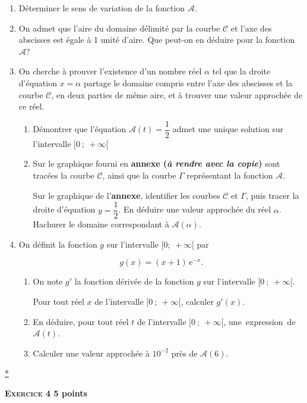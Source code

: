 \documentclass[10pt]{article}
\begin{document}
\begin{enumerate}
\item Déterminer le sens de variation de la fonction $\mathcal{A}$.
\item On admet que l'aire du domaine délimité par la courbe $\mathcal{C}$ et l'axe des abscisses est égale à 1 unité d'aire. Que peut-on en déduire pour la fonction $\mathcal{A}$?
\item On cherche à prouver l'existence d'un nombre réel $\alpha$ tel que la droite d'équation $x =\alpha$ partage le domaine compris entre l'axe des abscisses et la courbe $\mathcal{C}$, en deux parties de même aire, et à trouver une valeur approchée de ce réel.
	\begin{enumerate}
		\item Démontrer que l'équation $\mathcal{A}(t)=\dfrac12$ admet une unique solution sur l'intervalle $[0~;~+\infty[$
		\item Sur le graphique fourni en \textbf{annexe (\emph{à rendre avec la copie})} sont tracées la courbe $\mathcal{C}$, ainsi que la courbe $\Gamma$ représentant la fonction $\mathcal{A}$.
		
Sur le graphique de l'\textbf{annexe}, identifier les courbes $\mathcal{C}$ et $\Gamma$, puis tracer la droite d'équation $y=\dfrac12$. En déduire une valeur approchée du réel $\alpha$. Hachurer le domaine correspondant à $\mathcal{A}(\alpha)$.
	\end{enumerate}
\item On définit la fonction $g$ sur l'intervalle $[0;~+\infty[$ par 

\[g(x) = (x + 1)\,\mathrm{e}^{-x}.\]

	\begin{enumerate}
		\item  On note $g'$ la fonction dérivée de la fonction $g$ sur l'intervalle $[0~;~+\infty[$.
		
Pour tout réel $x$ de l'intervalle $[0~;~+\infty[$, calculer $g'(x)$. 
		\item En déduire, pour tout réel $t$ de l'intervalle $[0~;~+\infty[$, \mbox{une expression de $\mathcal{A}(t)$.}
		\item Calculer une valeur approchée à $10^{-2}$ près de $\mathcal{A}(6)$.
	\end{enumerate}
\end{enumerate}

\hyperlink{Index}{*}
\newpage

\textbf{\textsc{Exercice 4} \hfill  5 points}
\end{document}
